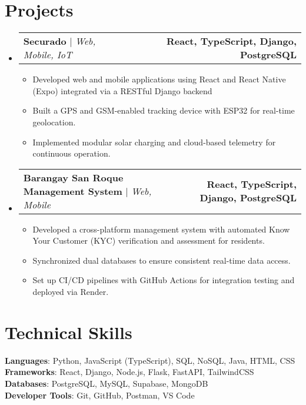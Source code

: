 \documentclass[letterpaper,11pt]{article}
\makeatletter
\newcommand{\resumeItem}[1]{
  \item\small{
    {#1 \vspace{0pt}}
  }
}
\newcommand{\resumeProjectHeading}[2]{
    \item
    \begin{tabular*}{1.001\textwidth}{l@{\extracolsep{\fill}}r}
      \small#1 & \textbf{\small #2}\\
    \end{tabular*}\vspace{-7pt}
}
\newcommand{\resumeSubHeadingListStart}{\begin{itemize}[leftmargin=0.0in, label={}]}
\newcommand{\resumeSubHeadingListEnd}{\end{itemize}}\vspace{0pt}
\newcommand{\resumeItemListStart}{\begin{itemize}}
\newcommand{\resumeItemListEnd}{\end{itemize}\vspace{-5pt}}
\makeatother
\begin{document}
\section{Projects} 
    \vspace{-5pt}
    \resumeSubHeadingListStart
    \resumeProjectHeading{\textbf{Securado} $|$ \emph{Web, Mobile, IoT}}{React, TypeScript, Django, PostgreSQL}
      \resumeItemListStart
        \resumeItem{Developed web and mobile applications using React and React Native (Expo) integrated via a RESTful Django backend}
        \resumeItem{Built a GPS and GSM-enabled tracking device with ESP32 for real-time geolocation.}
        \resumeItem{Implemented modular solar charging and cloud-based telemetry for continuous operation.}
      \resumeItemListEnd
    \vspace{-20pt}
    \resumeProjectHeading
      {\textbf{Barangay San Roque Management System} $|$ \emph{Web, Mobile}}{React, TypeScript, Django, PostgreSQL}
      \resumeItemListStart
        \resumeItem{Developed a cross-platform management system with automated Know Your Customer (KYC) verification and assessment for residents.}
        \resumeItem{Synchronized dual databases to ensure consistent real-time data access.}
        \resumeItem{Set up CI/CD pipelines with GitHub Actions for integration testing and deployed via Render.}
      \resumeItemListEnd
\resumeSubHeadingListEnd
\vspace{-12pt}

\section{Technical Skills}
 \begin{itemize}[leftmargin=0.15in, label={}]
    \small{\item{   
      \textbf{Languages}{: Python, JavaScript (TypeScript), SQL, NoSQL, Java, HTML, CSS} \\[1mm]
      \textbf{Frameworks}{: React, Django, Node.js, Flask, FastAPI, TailwindCSS} \\[1mm]
      \textbf{Databases}{: PostgreSQL, MySQL, Supabase, MongoDB} \\[1mm]
      \textbf{Developer Tools}{: Git, GitHub, Postman, VS Code}
    }}
 \end{itemize}
 \vspace{-16pt}
 \vspace{3pt}
\vspace{10pt}

\vspace{-15pt}
\end{document}

